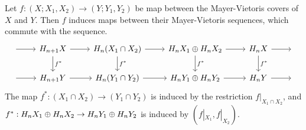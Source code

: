 \begin{prop} Let $f:(X;X_1,X_2)\rightarrow (Y;Y_1,Y_2)$ be map between the Mayer-Vietoris covers of $X$ and $Y$. Then $f$ induces maps between their Mayer-Vietoris sequences, which commute with the sequence.
\[\begin{tikzcd}
{} \arrow[r] & H_{n+1}X \arrow[d, "f^*"] \arrow[r] & H_n(X_1\cap X_2) \arrow[d, "f^*"] \arrow[r] & H_nX_1\dsum H_nX_2 \arrow[d, "f^*"] \arrow[r] & H_nX \arrow[d, "f^*"] \arrow[r] & {} \\
{} \arrow[r] & H_{n+1}Y \arrow[r]                  & H_n(Y_1\cap Y_2) \arrow[r]                  & H_nY_1\dsum H_nY_2 \arrow[r]                  & H_nY \arrow[r]                  & {}
\end{tikzcd}\]
The map $f^*:(X_1\cap X_2)\rightarrow (Y_1\cap Y_2)$ is induced by the restriction $f|_{X_1\cap X_2}$, and $f^*:H_n X_1\oplus H_n X_2 \rightarrow H_n Y_1\oplus H_n Y_2$ is induced by $(f|_{X_1},f|_{X_2})$.
\end{prop}

